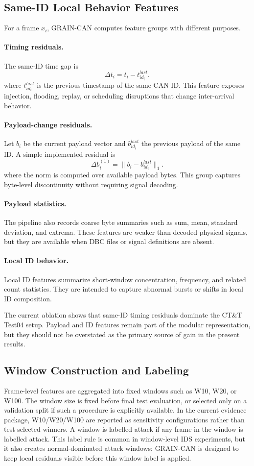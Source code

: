 \documentclass[runningheads]{llncs}
\newcommand{\method}{GRAIN-CAN}
\begin{document}
\subsection{Same-ID Local Behavior Features}
For a frame $x_i$, \method{} computes feature groups with different purposes.

\paragraph{Timing residuals.} The same-ID time gap is
\[
\Delta t_i = t_i - t^{last}_{id_i}.
\]
where $t^{last}_{id_i}$ is the previous timestamp of the same CAN ID. This feature exposes injection, flooding, replay, or scheduling disruptions that change inter-arrival behavior.

\paragraph{Payload-change residuals.} Let $b_i$ be the current payload vector and $b^{last}_{id_i}$ the previous payload of the same ID. A simple implemented residual is
\[
\Delta b_i^{(1)} = \lVert b_i-b^{last}_{id_i}\rVert_1.
\]
where the norm is computed over available payload bytes. This group captures byte-level discontinuity without requiring signal decoding.

\paragraph{Payload statistics.} The pipeline also records coarse byte summaries such as sum, mean, standard deviation, and extrema. These features are weaker than decoded physical signals, but they are available when DBC files or signal definitions are absent.

\paragraph{Local ID behavior.} Local ID features summarize short-window concentration, frequency, and related count statistics. They are intended to capture abnormal bursts or shifts in local ID composition.

The current ablation shows that same-ID timing residuals dominate the CT\&T Test04 setup. Payload and ID features remain part of the modular representation, but they should not be overstated as the primary source of gain in the present results.

\subsection{Window Construction and Labeling}
Frame-level features are aggregated into fixed windows such as W10, W20, or W100. The window size is fixed before final test evaluation, or selected only on a validation split if such a procedure is explicitly available. In the current evidence package, W10/W20/W100 are reported as sensitivity configurations rather than test-selected winners. A window is labelled attack if any frame in the window is labelled attack. This label rule is common in window-level IDS experiments, but it also creates normal-dominated attack windows; \method{} is designed to keep local residuals visible before this window label is applied.
\end{document}
